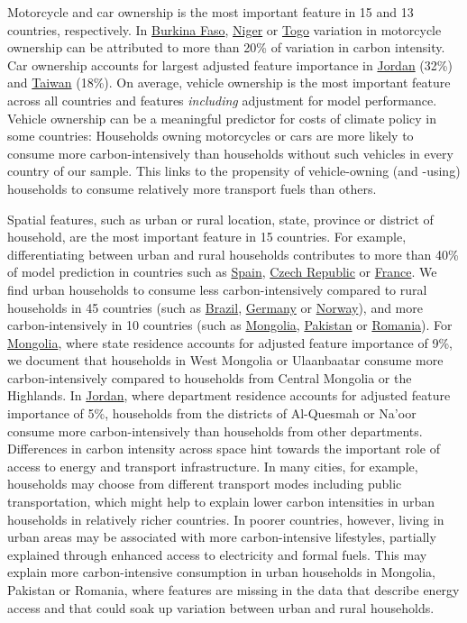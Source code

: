 \documentclass[12pt, a4paper]{article}
\begin{document}
Motorcycle and car ownership is the most important feature in 15 and 13 countries, respectively. In \hyperref[fig:5b_BFA]{Burkina Faso}, \hyperref[fig:5b_NER]{Niger} or \hyperref[fig:5b_TGO]{Togo} variation in motorcycle ownership can be attributed to more than 20\% of variation in carbon intensity. Car ownership accounts for largest adjusted feature importance in \hyperref[fig:5b_JOR]{Jordan} (32\%) and \hyperref[fig:5b_TWN]{Taiwan} (18\%). On average, vehicle ownership is the most important feature across all countries and features \textit{including} adjustment for model performance. Vehicle ownership can be a meaningful predictor for costs of climate policy in some countries: Households owning motorcycles or cars are more likely to consume more carbon-intensively than households without such vehicles in every country of our sample. This links to the propensity of vehicle-owning (and -using) households to consume relatively more transport fuels than others.

Spatial features, such as urban or rural location, state, province or district of household, are the most important feature in 15 countries. For example, differentiating between urban and rural households contributes to more than 40\% of model prediction in countries such as \hyperref[fig:5b_ESP]{Spain}, \hyperref[fig:5b_CZE]{Czech Republic} or \hyperref[fig:5b_FRA]{France}. We find urban households to consume less carbon-intensively compared to rural households in 45 countries (such as \hyperref[fig:5b_BRA]{Brazil}, \hyperref[fig:5b_DEU]{Germany} or \hyperref[fig:5b_NOR]{Norway}), and more carbon-intensively in 10 countries (such as \hyperref[fig:5b_MNG]{Mongolia}, \hyperref[fig:5b_PAK]{Pakistan} or \hyperref[fig:5b_ROU]{Romania}). For \hyperref[fig:5b_MNG]{Mongolia}, where state residence accounts for adjusted feature importance of 9\%, we document that households in West Mongolia or Ulaanbaatar consume more carbon-intensively compared to households from Central Mongolia or the Highlands. In \hyperref[fig:5b_JOR]{Jordan}, where department residence accounts for adjusted feature importance of 5\%, households from the districts of Al-Quesmah or Na'oor consume more carbon-intensively than households from other departments. Differences in carbon intensity across space hint towards the important role of access to energy and transport infrastructure. In many cities, for example, households may choose from different transport modes including public transportation, which might help to explain lower carbon intensities in urban households in relatively richer countries. In poorer countries, however, living in urban areas may be associated with more carbon-intensive lifestyles, partially explained through enhanced access to electricity and formal fuels. This may explain more carbon-intensive consumption in urban households in Mongolia, Pakistan or Romania, where features are missing in the data that describe energy access and that could soak up variation between urban and rural households.
\end{document}
